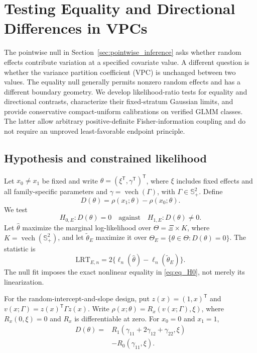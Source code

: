 \section{Testing Equality and Directional Differences in VPCs}
\label{sec:equality_vpc}

The pointwise null in Section~\ref{sec:pointwise_inference} asks whether
random effects contribute variation at a specified covariate value. A
different question is whether the variance partition coefficient (VPC)
is unchanged between two values. The equality null generally permits
nonzero random effects and has a different boundary geometry. We develop likelihood-ratio tests for equality and directional
contrasts, characterize their fixed-stratum Gaussian limits, and provide
conservative compact-uniform calibrations on verified GLMM classes.
The latter allow arbitrary positive-definite Fisher-information coupling
and do not require an unproved least-favorable endpoint principle.

\subsection{Hypothesis and constrained likelihood}
\label{subsec:eq_hypothesis}
Let $x_0\ne x_1$ be fixed and write
$\theta=(\xi^{\mathsf T},\gamma^{\mathsf T})^{\mathsf T}$,
where $\xi$ includes fixed effects and all family-specific parameters
and $\gamma=\operatorname{vech}(\Gamma)$, with
$\Gamma\in\mathbb S_+^2$. Define
\begin{equation}\label{eq:eq_D}
 D(\theta)=\rho(x_1;\theta)-\rho(x_0;\theta).
\end{equation}
We test
\begin{equation}\label{eq:eq_H0}
 H_{0,E}:D(\theta)=0
 \quad\text{against}\quad H_{1,E}:D(\theta)\ne0.
\end{equation}
Let $\widehat\theta$ maximize the marginal log-likelihood over
$\Theta=\Xi\times K$, where
$K=\operatorname{vech}(\mathbb S_+^2)$, and let
$\widetilde\theta_E$ maximize it over
$\Theta_E=\{\theta\in\Theta:D(\theta)=0\}$. The statistic is
\begin{equation}\label{eq:eq_LRT}
 \mathrm{LRT}_{E,n}=2\{\ell_n(\widehat\theta)
                  -\ell_n(\widetilde\theta_E)\}.
\end{equation}
The null fit imposes the exact nonlinear equality in
\eqref{eq:eq_H0}, not merely its linearization.

For the random-intercept-and-slope design, put
$z(x)=(1,x)^{\mathsf T}$ and
$v(x;\Gamma)=z(x)^{\mathsf T}\Gamma z(x)$.
Write $\rho(x;\theta)=R_x(v(x;\Gamma),\xi)$,
where $R_x(0,\xi)=0$ and $R_x$ is differentiable at zero.
For $x_0=0$ and $x_1=1$,
\begin{equation}\label{eq:eq_D01}
\begin{aligned}
 D(\theta)={}&R_1(\gamma_{11}+2\gamma_{12}
                     +\gamma_{22},\xi)\\
 &-R_0(\gamma_{11},\xi).
\end{aligned}
\end{equation}

